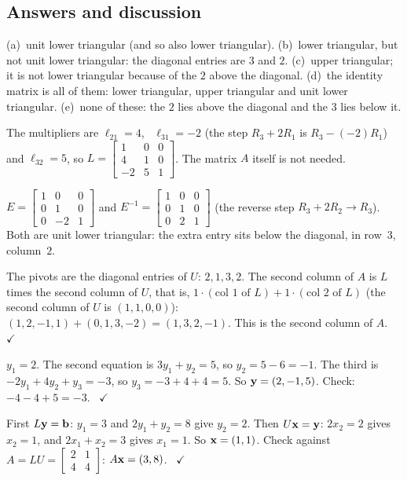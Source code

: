 \documentclass[11pt]{article}
\begin{document}
\subsection*{Answers and discussion}
\begin{description}[leftmargin=0pt,itemsep=5pt]
  \item[Knowledge Check \ref{kc:triangular}.] (a)~unit lower triangular (and so also lower triangular). (b)~lower triangular, but not unit lower triangular: the diagonal entries are $3$ and $2$. (c)~upper triangular; it is not lower triangular because of the $2$ above the diagonal. (d)~the identity matrix is all of them: lower triangular, upper triangular and unit lower triangular. (e)~none of these: the $2$ lies above the diagonal and the $3$ lies below it.
  \item[Knowledge Check \ref{kc:fillL}.] The multipliers are $\ell_{21}=4$, \ $\ell_{31}=-2$ (the step $R_3+2R_1$ is $R_3-(-2)R_1$) and $\ell_{32}=5$, so $L=\begin{bmatrix}1&0&0\\4&1&0\\-2&5&1\end{bmatrix}$. The matrix $A$ itself is not needed.
  \item[Knowledge Check \ref{kc:inverseE}.] $E=\begin{bmatrix}1&0&0\\0&1&0\\0&-2&1\end{bmatrix}$ and $E^{-1}=\begin{bmatrix}1&0&0\\0&1&0\\0&2&1\end{bmatrix}$ (the reverse step $R_3+2R_2\to R_3$). Both are unit lower triangular: the extra entry sits below the diagonal, in row~$3$, column~$2$.
  \item[Knowledge Check \ref{kc:twochecks}.] The pivots are the diagonal entries of $U$: $2,1,3,2$. The second column of $A$ is $L$ times the second column of $U$, that is, $1\cdot(\text{col }1\text{ of }L)+1\cdot(\text{col }2\text{ of }L)$ (the second column of $U$ is $(1,1,0,0)$): $(1,2,-1,1)+(0,1,3,-2)=(1,3,2,-1)$. This is the second column of $A$. \ $\checkmark$
  \item[Knowledge Check \ref{kc:fwdsub}.] $y_1=2$. The second equation is $3y_1+y_2=5$, so $y_2=5-6=-1$. The third is $-2y_1+4y_2+y_3=-3$, so $y_3=-3+4+4=5$. So $\mathbf{y}=(2,-1,5)$. Check: $-4-4+5=-3$. \ $\checkmark$
  \item[Knowledge Check \ref{kc:bothtri}.] First $L\mathbf{y}=\mathbf{b}$: $y_1=3$ and $2y_1+y_2=8$ give $y_2=2$. Then $U\mathbf{x}=\mathbf{y}$: $2x_2=2$ gives $x_2=1$, and $2x_1+x_2=3$ gives $x_1=1$. So $\mathbf{x}=(1,1)$. Check against $A=LU=\begin{bmatrix}2&1\\4&4\end{bmatrix}$: $A\mathbf{x}=(3,8)$. \ $\checkmark$

\end{description}
\end{document}
